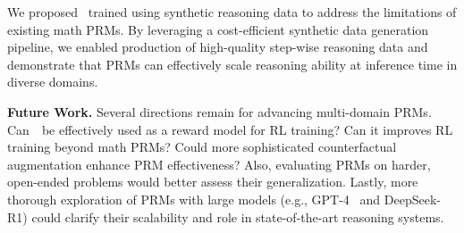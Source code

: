 

We proposed \ourprm~trained using synthetic reasoning data to address the limitations of existing math PRMs.
By leveraging a cost-efficient synthetic data generation pipeline, we enabled production of high-quality step-wise reasoning data and demonstrate that PRMs can effectively scale reasoning ability at inference time in diverse domains.




\textbf{Future Work.}
Several directions remain for advancing multi-domain PRMs. Can~\ourprm~be effectively used as a reward model for RL training? Can it improves RL training beyond math PRMs? Could more sophisticated counterfactual augmentation enhance PRM effectiveness? Also, evaluating PRMs on harder, open-ended problems would better assess their generalization. Lastly, more thorough exploration of PRMs with large models (e.g., GPT-4~\citep{achiam2023gpt} and DeepSeek-R1) could clarify their scalability and role in state-of-the-art reasoning systems.





